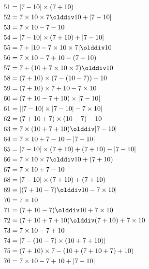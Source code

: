\begin{align*}
    51  & = |7-10|\times(7+10)                             \\
    52  & = 7\times10\times7\olddiv10+|7-10|               \\
    53  & = 7\times10-7-10                                 \\
    54  & = |7-10|\times(7+10)+|7-10|                      \\
    55  & = 7+|10-7\times10\times7|\olddiv10               \\
    56  & = 7\times10-7+10-(7+10)                          \\
    57  & = 7+(10+7\times10\times7)\olddiv10               \\
    58  & = (7+10)\times(7-(10-7))-10                      \\
    59  & = (7+10)\times7+10-7\times10                     \\
    60  & = (7+10-7+10)\times|7-10|                        \\
    61  & = ||7-10|\times|7-10|-7\times10|                 \\
    62  & = (7+10+7)\times(10-7)-10                        \\
    63  & = 7\times(10+7+10)\olddiv|7-10|                  \\
    64  & = 7\times10+7-10-|7-10|                          \\
    65  & = |7-10|\times(7+10)+(7+10)-|7-10|               \\
    66  & = 7\times10\times7\olddiv10+(7+10)               \\
    67  & = 7\times10+7-10                                 \\
    68  & = |7-10|\times(7+10)+(7+10)                      \\
    69  & = |(7+10-7)\olddiv10-7\times10|                  \\
    70  & = 7\times10                                      \\
    71  & = (7+10-7)\olddiv10+7\times10                    \\
    72  & = (7+10+7+10)\olddiv(7+10)+7\times10             \\
    73  & = 7\times10-7+10                                 \\
    74  & = |7-(10-7)\times(10+7+10)|                      \\
    75  & = (7+10)\times7-(10+(7+10+7)+10)                 \\
    76  & = 7\times10-7+10+|7-10|                          \\

\end{align*}
